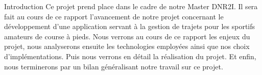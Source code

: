 {\Huge{Introduction}}
\vspace{2.5cm}
Ce projet prend place dans le cadre de notre Master DNR2I. Il sera fait au cours de ce rapport l'avancement de notre projet concernant le développement d'une application servant à la gestion de trajets pour les sportifs amateurs de course à pieds. Nous verrons au cours de ce rapport les enjeux du projet, nous analyserons ensuite les technologies employées ainsi que nos choix d'implémentations. Puis nous verrons en détail la réalisation du projet. Et enfin, nous terminerons par un bilan généralisant notre travail sur ce projet.